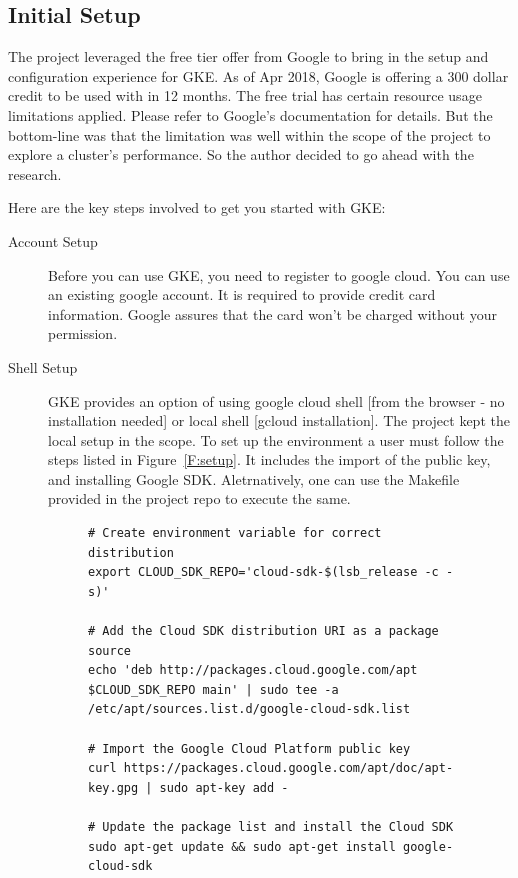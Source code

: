 \subsection{Initial Setup}

The project leveraged the free tier offer from Google to bring in the setup
and configuration experience for GKE. As of Apr 2018, Google is offering a 300
dollar credit to be used with in 12 months. The free trial has certain
resource usage limitations applied. Please refer to Google's documentation for
details. But the bottom-line was that the limitation was well within the scope
of the project to explore a cluster's performance. So the author decided to
go ahead with the research.

Here are the key steps involved to get you started with GKE:

\begin{description}

\item[Account Setup] Before you can use GKE, you need to register to google
  cloud. You can use an existing google account. It is required to provide
  credit card information.  Google assures that the card won't be charged
  without your permission.

\item[Shell Setup] GKE provides an option of using google cloud shell [from
  the browser - no installation needed] or local shell [gcloud installation].
  The project kept the local setup in the scope. To set up the environment a
  user must follow the steps listed in Figure~\ref{F:setup}. It includes the
  import of the public key, and installing Google SDK. Aletrnatively, one can
  use the Makefile provided in the project repo to execute the same.

\begin{figure}[htb]
\begin{footnotesize}
\begin{verbatim}
# Create environment variable for correct distribution
export CLOUD_SDK_REPO='cloud-sdk-$(lsb_release -c -s)'

# Add the Cloud SDK distribution URI as a package source
echo 'deb http://packages.cloud.google.com/apt $CLOUD_SDK_REPO main' | sudo tee -a /etc/apt/sources.list.d/google-cloud-sdk.list

# Import the Google Cloud Platform public key
curl https://packages.cloud.google.com/apt/doc/apt-key.gpg | sudo apt-key add -

# Update the package list and install the Cloud SDK
sudo apt-get update && sudo apt-get install google-cloud-sdk
\end{verbatim}


\end{footnotesize}
\end{figure}
\end{description}
